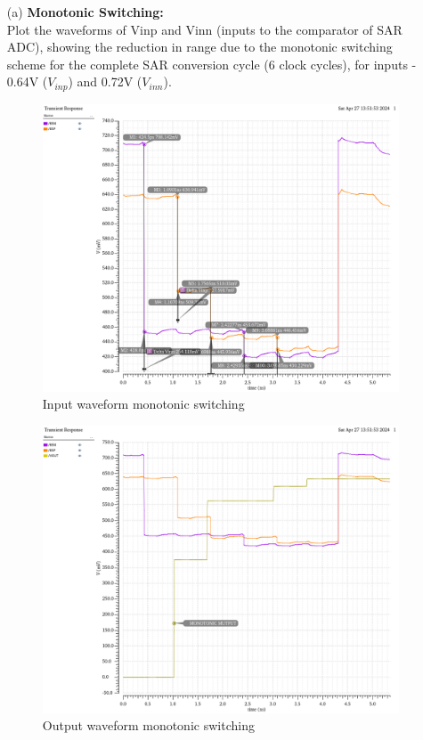 \documentclass[a4paper,12pt]{article}
\begin{document}
\begin{itemize}
    \item[(a)]\textbf{Monotonic Switching:}\\
    Plot the waveforms of Vinp and Vinn (inputs to the comparator of SAR ADC), showing the reduction in range due to the monotonic switching scheme for the complete SAR conversion cycle (6 clock cycles), for inputs - 0.64V ($V_{inp}$) and 0.72V ($V_{inn}$).

    \begin{figure}[H]
        \centering
        \includegraphics[max width = \textwidth]{3/3_VIN_MONOTONIC.png}
        \caption{Input waveform monotonic switching}
        \label{fig:enter-label}
    \end{figure}

    
    \begin{figure}[H]
        \centering
        \includegraphics[max width = \textwidth]{3/3_VOUT_MONOTONIC.png}
        \caption{Output waveform monotonic switching}
        \label{fig:enter-label}
    \end{figure}


\end{itemize}
\end{document}
